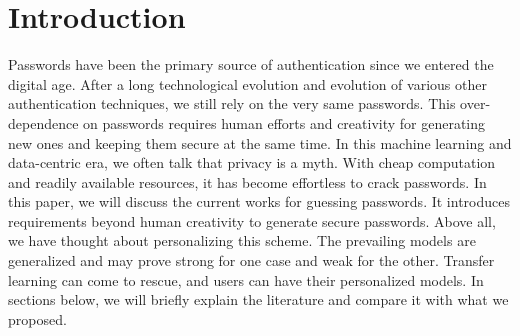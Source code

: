 \documentclass[runningheads]{llncs}
\begin{document}
\section{Introduction}
Passwords have been the primary source of authentication since we entered the digital age. After a long technological evolution and evolution of various other authentication techniques, we still rely on the very same passwords. This over-dependence on passwords requires human efforts and creativity for generating new ones and keeping them secure at the same time. In this machine learning and data-centric era, we often talk that privacy is a myth. With cheap computation and readily available resources, it has become effortless to crack passwords. In this paper, we will discuss the current works for guessing passwords. It introduces requirements beyond human creativity to generate secure passwords. Above all, we have thought about personalizing this scheme. The prevailing models are generalized and may prove strong for one case and weak for the other. Transfer learning can come to rescue, and users can have their personalized models. In sections below, we will briefly explain the literature and compare it with what we proposed.
\end{document}
